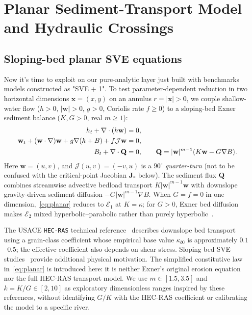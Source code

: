 \documentclass[12pt,a4paper,oneside]{report}
\numberwithin{equation}{chapter}
\theoremstyle{definition}
\theoremstyle{remark}\newtheorem{remark}[theorem]{Remark}
\begin{document}
\chapter{Planar Sediment-Transport Model and Hydraulic Crossings}\label{ch:continuation}

\section{Sloping-bed planar SVE equations}\label{sec:annular-model}

Now it's time to exploit on our pure-analytic layer just built with benchmarks models constructed as "SVE + 1". To test parameter-dependent reduction in two horizontal dimensions $\mathbf x=(x,y)$ on an annulus $r=|\mathbf x|>0$, we couple shallow-water flow ($h>0$, $|\mathbf w|>0$, $g>0$, Coriolis rate $f\ge0$) to a sloping-bed Exner sediment balance ($K,G>0$, real $m\ge1$):
\begin{align}\label{eq:planar}
 h_t+\nabla\cdot(h\mathbf w)&=0,\notag\\
 \mathbf w_t+(\mathbf w\cdot\nabla)\mathbf w+g\nabla(h+B)+f\mathcal J\mathbf w&=0,\notag\\
 B_t+\nabla\cdot\mathbf Q&=0,\qquad
 \mathbf Q=|\mathbf w|^{m-1}(K\mathbf w-G\nabla B).
\end{align}
Here $\mathbf w=(u,v)$, and $\mathcal J(u,v)=(-v,u)$ is a $90^\circ$ \emph{quarter-turn} (not to be confused with the critical-point Jacobian $\mathbf J_*$ below). The sediment flux $\mathbf Q$ combines streamwise advective bedload transport $K|\mathbf w|^{m-1}\mathbf w$ with downslope gravity-driven sediment diffusion $-G|\mathbf w|^{m-1}\nabla B$. When $G=f=0$ in one dimension,~\eqref{eq:planar} reduces to $\mathcal E_1$ at $K=\kappa$; for $G>0$, Exner bed diffusion makes $\mathcal E_2$ mixed hyperbolic--parabolic rather than purely hyperbolic~\cite{fernandez2017,burger2025}.

The USACE \texttt{HEC-RAS} technical reference~\cite[Sec.~2.9, Eqs.~(2-46)--(2-48)]{hecras2019} describes downslope bed transport using a grain-class coefficient whose empirical base value $\kappa_{b0}$ is approximately $0.1$--$0.5$; the effective coefficient also depends on shear stress. Sloping-bed SVE studies~\cite{fernandez2017,burger2025} provide additional physical motivation. The simplified constitutive law in~\eqref{eq:planar} is introduced here: it is neither Exner's original erosion equation nor the full HEC-RAS transport model. We use $m\in[1.5,3.5]$ and $k=K/G\in[2,10]$ as exploratory dimensionless ranges inspired by these references, without identifying $G/K$ with the HEC-RAS coefficient or calibrating the model to a specific river.
\end{document}
